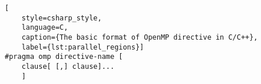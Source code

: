 \begin{lstlisting}[
    style=csharp_style,
    language=C, 
    caption={The basic format of OpenMP directive in C/C++},
    label={lst:parallel_regions}]
#pragma omp directive-name [
    clause[ [,] clause]...
    ]
\end{lstlisting}